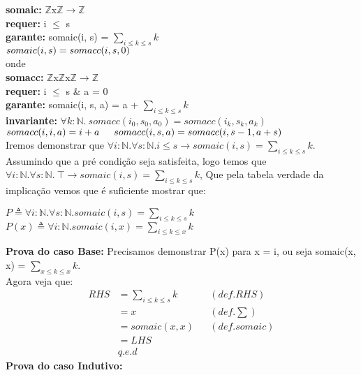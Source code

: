 \documentclass{article}
\begin{document}
\noindent \textbf{somaic:} $\mathbb{Z}$x$\mathbb{Z}$$ \rightarrow \mathbb{Z}$\\
\textbf{requer:} i $\leq$ s\\
\textbf{garante:} somaic(i, s) = $\sum\limits_{i \le k \le s} k$\\
$somaic(i, s) = somacc(i, s, 0)\\$
\\
onde\\
\indent \textbf{somacc:} $\mathbb{Z}$x$\mathbb{Z}$x$\mathbb{Z}$$ \rightarrow \mathbb{Z}$\\
\indent \textbf{requer:} i $\leq$ s \& a = 0\\
\indent \textbf{garante:} somaic(i, s, a) = a + $\sum\limits_{i \le k \le s} k$\\
\indent \textbf{invariante:} $\forall k:\mathbb{N}.\: somacc(i_0, s_0, a_0) = somacc(i_k, s_k, a_k)$\\
\indent $somacc(i, i, a) = i + a\\
\indent somacc(i, s, a) = somacc(i, s-1, a+s)\\$
\\
Iremos demonstrar que
$\forall i:\mathbb{N}. \forall s:\mathbb{N}. i \leq s\rightarrow somaic(i, s) = \sum\limits_{i \le k \le s} k$.
Assumindo que a pré condição seja satisfeita, logo temos que
$\forall i:\mathbb{N}. \forall s:\mathbb{N}.\: \top\rightarrow somaic(i, s) = \sum\limits_{i \le k \le s} k$,
Que pela tabela verdade da implicação vemos que é suficiente mostrar que:\\
\begin{center}
$P \triangleq \forall i:\mathbb{N}. \forall s:\mathbb{N}. somaic(i, s) = \sum\limits_{i \le k \le s} k$\\
$P(x) \triangleq \forall i:\mathbb{N}. somaic(i, x) = \sum\limits_{i \le k \le x} k$\\
\end{center}
\textbf{Prova do caso Base:} Precisamos demonstrar P(x) para x = i,
ou seja somaic(x, x) = $\sum\limits_{x \le k \le x} k$.\\
Agora veja que:
\begin{align*}
RHS &= \sum\limits_{i \le k \le s} k && (def. RHS)\\
&= x && (def. \sum)\\
&= somaic(x, x) && (def. somaic)\\
&= LHS \\
& q.e.d
\end{align*}
\textbf{Prova do caso Indutivo:} 
\end{document}
